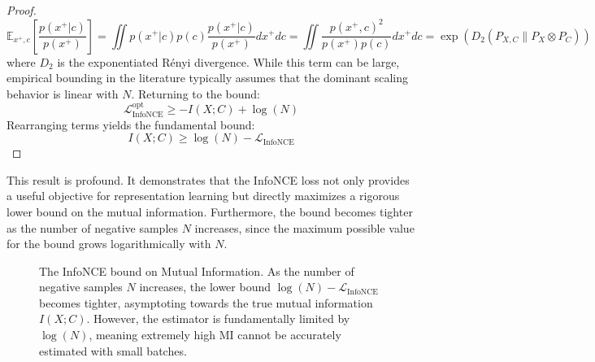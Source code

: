 \begin{proof}
\begin{equation}
    \mathbb{E}_{x^+, c} \left[ \frac{p(x^+|c)}{p(x^+)} \right] = \iint p(x^+|c) p(c) \frac{p(x^+|c)}{p(x^+)} dx^+ dc = \iint \frac{p(x^+, c)^2}{p(x^+)p(c)} dx^+ dc = \exp(D_2(P_{X,C} \parallel P_X \otimes P_C))
\end{equation}
where $D_2$ is the exponentiated R\'enyi divergence. While this term can be large, empirical bounding in the literature typically assumes that the dominant scaling behavior is linear with $N$. Returning to the bound:
\begin{equation}
    \mathcal{L}_{\text{InfoNCE}}^{\text{opt}} \ge - I(X; C) + \log(N)
\end{equation}
Rearranging terms yields the fundamental bound:
\begin{equation}
    I(X; C) \ge \log(N) - \mathcal{L}_{\text{InfoNCE}}
\end{equation}
\end{proof}

This result is profound. It demonstrates that the InfoNCE loss not only provides a useful objective for representation learning but directly maximizes a rigorous lower bound on the mutual information. Furthermore, the bound becomes tighter as the number of negative samples $N$ increases, since the maximum possible value for the bound grows logarithmically with $N$.

\begin{figure}[htbp]
\centering
{}
\caption{The InfoNCE bound on Mutual Information. As the number of negative samples $N$ increases, the lower bound $\log(N) - \mathcal{L}_{\text{InfoNCE}}$ becomes tighter, asymptoting towards the true mutual information $I(X; C)$. However, the estimator is fundamentally limited by $\log(N)$, meaning extremely high MI cannot be accurately estimated with small batches.}
\label{fig:infonce_bound}
\end{figure}

